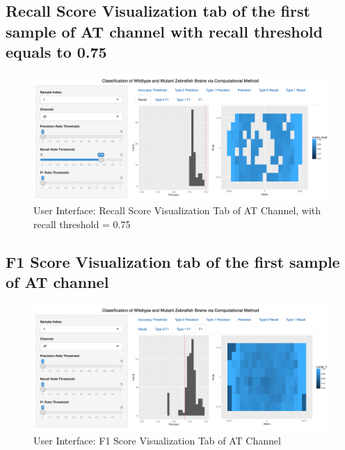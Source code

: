 \documentclass[10pt,letterpaper]{article}
\begin{document}
\subsection{Recall Score Visualization tab of the first sample of AT
channel with recall threshold equals to
0.75}\label{recall-score-visualization-tab-of-the-first-sample-of-at-channel-with-recall-threshold-equals-to-0.75}

\begin{figure}[h]

{\centering \includegraphics[width=4.91in]{figures/shiny5} 

}

\caption{User Interface: Recall Score Visualization Tab of AT Channel, with recall threshold = 0.75}\label{fig:shiny5}
\end{figure}

\newpage

\subsection{F1 Score Visualization tab of the first sample of AT
channel}\label{f1-score-visualization-tab-of-the-first-sample-of-at-channel}

\begin{figure}[h]

{\centering \includegraphics[width=4.9in]{figures/shiny6} 

}

\caption{User Interface: F1 Score Visualization Tab of AT Channel}\label{fig:shiny6}
\end{figure}
\end{document}
